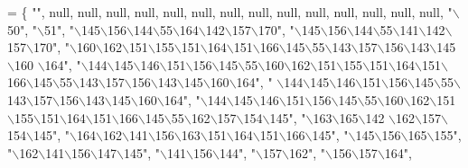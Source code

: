 \begin{DoxyCode}
= \{
        \textcolor{stringliteral}{""}, null, null, null, null, null, null, null, null, null, null, null, null,
        null, null, \textcolor{stringliteral}{"\(\backslash\)50"}, \textcolor{stringliteral}{"\(\backslash\)51"}, \textcolor{stringliteral}{"\(\backslash\)145\(\backslash\)156\(\backslash\)144\(\backslash\)55\(\backslash\)164\(\backslash\)142\(\backslash\)157\(\backslash\)170"},
        \textcolor{stringliteral}{"\(\backslash\)145\(\backslash\)156\(\backslash\)144\(\backslash\)55\(\backslash\)141\(\backslash\)142\(\backslash\)157\(\backslash\)170"}, \textcolor{stringliteral}{"\(\backslash\)160\(\backslash\)162\(\backslash\)151\(\backslash\)155\(\backslash\)151\(\backslash\)164\(\backslash\)151\(\backslash\)166\(\backslash\)145\(\backslash\)55\(\backslash\)143\(\backslash\)157\(\backslash\)156\(\backslash\)143\(\backslash\)145\(\backslash\)160
      \(\backslash\)164"},
        \textcolor{stringliteral}{"\(\backslash\)144\(\backslash\)145\(\backslash\)146\(\backslash\)151\(\backslash\)156\(\backslash\)145\(\backslash\)55\(\backslash\)160\(\backslash\)162\(\backslash\)151\(\backslash\)155\(\backslash\)151\(\backslash\)164\(\backslash\)151\(\backslash\)166\(\backslash\)145\(\backslash\)55\(\backslash\)143\(\backslash\)157\(\backslash\)156\(\backslash\)143\(\backslash\)145\(\backslash\)160\(\backslash\)164"}, \textcolor{stringliteral}{"
      \(\backslash\)144\(\backslash\)145\(\backslash\)146\(\backslash\)151\(\backslash\)156\(\backslash\)145\(\backslash\)55\(\backslash\)143\(\backslash\)157\(\backslash\)156\(\backslash\)143\(\backslash\)145\(\backslash\)160\(\backslash\)164"},
        \textcolor{stringliteral}{"\(\backslash\)144\(\backslash\)145\(\backslash\)146\(\backslash\)151\(\backslash\)156\(\backslash\)145\(\backslash\)55\(\backslash\)160\(\backslash\)162\(\backslash\)151\(\backslash\)155\(\backslash\)151\(\backslash\)164\(\backslash\)151\(\backslash\)166\(\backslash\)145\(\backslash\)55\(\backslash\)162\(\backslash\)157\(\backslash\)154\(\backslash\)145"}, \textcolor{stringliteral}{"\(\backslash\)163\(\backslash\)165\(\backslash\)142
      \(\backslash\)162\(\backslash\)157\(\backslash\)154\(\backslash\)145"}, \textcolor{stringliteral}{"\(\backslash\)164\(\backslash\)162\(\backslash\)141\(\backslash\)156\(\backslash\)163\(\backslash\)151\(\backslash\)164\(\backslash\)151\(\backslash\)166\(\backslash\)145"},
        \textcolor{stringliteral}{"\(\backslash\)145\(\backslash\)156\(\backslash\)165\(\backslash\)155"}, \textcolor{stringliteral}{"\(\backslash\)162\(\backslash\)141\(\backslash\)156\(\backslash\)147\(\backslash\)145"}, \textcolor{stringliteral}{"\(\backslash\)141\(\backslash\)156\(\backslash\)144"}, \textcolor{stringliteral}{"\(\backslash\)157\(\backslash\)162"}, \textcolor{stringliteral}{"\(\backslash\)156\(\backslash\)157\(\backslash\)164"},

\end{DoxyCode}
